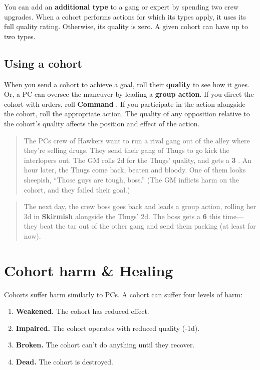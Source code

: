 \documentclass[11pt,oneside]{book}
\newcommand{\gameterm}[1]{\textbf{#1}}
\begin{document}
You can add an \textbf{additional type} to a gang or expert by spending two crew upgrades. When a cohort performs actions for which its types apply, it uses its full quality rating. Otherwise, its quality is zero. A given cohort can have up to two types.

\subsection{Using a cohort}

When you send a cohort to achieve a goal, roll their \textbf{quality} to see how it goes. Or, a PC can oversee the maneuver by leading a \textbf{group action}. If you direct the cohort with orders, roll \gameterm{Command} . If you participate in the action alongside the cohort, roll the appropriate action. The quality of any opposition relative to the cohort’s quality affects the position and effect of the action.

\begin{quote}
	The PCs crew of Hawkers want to run a rival gang out of the alley where they’re selling drugs. They send their gang of Thugs to go kick the interlopers out. The GM rolls 2d for the Thugs’ quality, and gets a \gameterm{3} . An hour later, the Thugs come back, beaten and bloody. One of them looks sheepish, “Those guys are tough, boss.” (The GM inflicts harm on the cohort, and they failed their goal.)
\end{quote} 

\begin{quote}
	The next day, the crew boss goes back and leads a group action, rolling her 3d in \gameterm{Skirmish}  alongside the Thugs’ 2d. The boss gets a \gameterm{6}  this time---they beat the tar out of the other gang and send them packing (at least for now).
\end{quote} 

\section{Cohort harm \& Healing}

Cohorts suffer harm similarly to PCs. A cohort can suffer four levels of harm:
\begin{enumerate}
	\item \textbf{Weakened.} The cohort has reduced effect.
	\item \textbf{Impaired.} The cohort operates with reduced quality (-1d).
	\item \textbf{Broken.} The cohort can’t do anything until they recover.
	\item \textbf{Dead.} The cohort is destroyed.
\end{enumerate}
\end{document}

